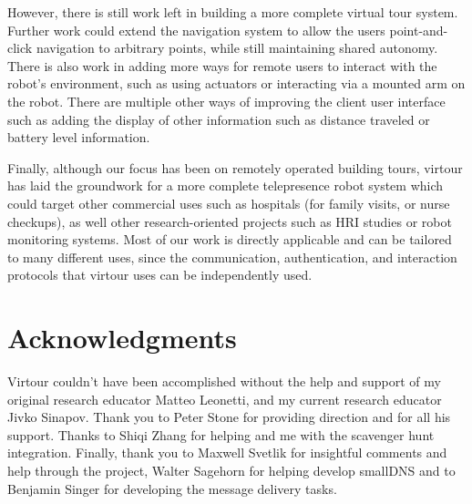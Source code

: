 \documentclass[
  oneside,
  11pt, a4paper,
  footinclude=true,
  headinclude=true,
  cleardoublepage=empty
]{article}
\begin{document}
However, there is still work left in building a more complete virtual tour
system. Further work could extend the navigation system to allow the users
point-and-click navigation to arbitrary points, while still maintaining shared
autonomy. There is also work in adding more ways for remote users to interact
with the robot's environment, such as using actuators or interacting via a
mounted arm on the robot. There are multiple other ways of improving the client
user interface such as adding the display of other information such as distance
traveled or battery level information.

Finally, although our focus has been on remotely operated building tours,
virtour has laid the groundwork for a more complete telepresence robot system
which could target other commercial uses such as hospitals (for family visits,
or nurse checkups), as well other research-oriented projects such as HRI
studies or robot monitoring systems. Most of our work is directly applicable
and can be tailored to many different uses, since the communication,
authentication, and interaction protocols that virtour uses can be independently
used.

\section{Acknowledgments}

Virtour couldn't have been accomplished without the help and support of my
original research educator Matteo Leonetti, and my current research educator
Jivko Sinapov. Thank you to Peter Stone for providing direction and for all his
support. Thanks to Shiqi Zhang for helping and me with the scavenger hunt
integration. Finally, thank you to Maxwell Svetlik for insightful comments and
help through the project, Walter Sagehorn for helping develop smallDNS and to
Benjamin Singer for developing the message delivery tasks.

\nocite{*}


    
\end{document}
